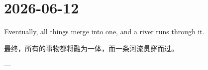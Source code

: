 \section*{2026-06-12}
Eventually, all things merge into one, and a river runs through it. \par
最终，所有的事物都将融为一体，而一条河流贯穿而过。 \par
\hfill ---  \par
